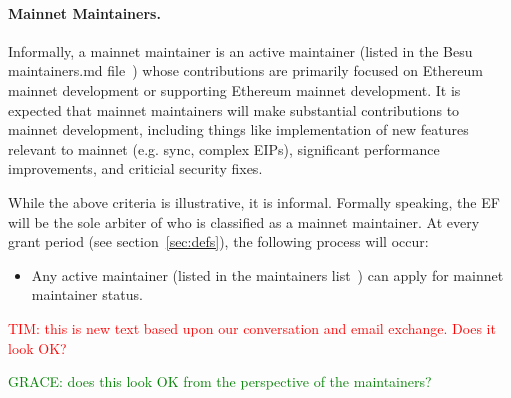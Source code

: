 \paragraph{Mainnet Maintainers.} Informally, a mainnet maintainer is an active maintainer (listed in the Besu maintainers.md file~\cite{BesuM}) whose contributions are primarily focused on Ethereum mainnet development or supporting Ethereum mainnet development.  It is expected that mainnet maintainers will make substantial contributions to mainnet development, including things like implementation of new features relevant to mainnet (e.g. sync, complex EIPs), significant performance improvements, and criticial security fixes.

While the above criteria is illustrative, it is informal.  Formally speaking, the EF will be the sole arbiter of who is classified as a mainnet maintainer.  At every grant period (see section~\ref{sec:defs}), the following process will occur:
\begin{itemize}
\item Any active maintainer (listed in the maintainers list~\cite{BesuM}) can apply for mainnet maintainer status.  
\end{itemize}

\textcolor{red}{TIM:  this is new text based upon our conversation and email exchange.  Does it look OK?}

\textcolor{green}{GRACE:  does this look OK from the perspective of the maintainers?}